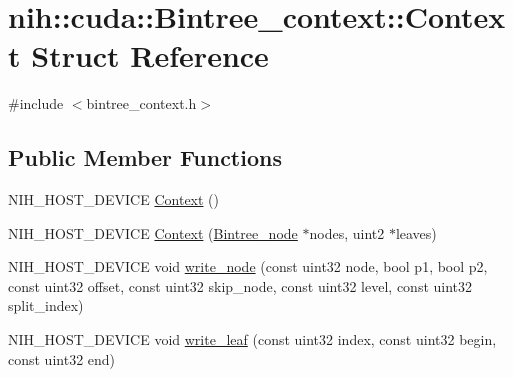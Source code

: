 \hypertarget{structnih_1_1cuda_1_1_bintree__context_1_1_context}{
\section{nih\-:\-:cuda\-:\-:\-Bintree\-\_\-context\-:\-:\-Context \-Struct \-Reference}
\label{structnih_1_1cuda_1_1_bintree__context_1_1_context}
}


{\ttfamily \#include $<$bintree\-\_\-context.\-h$>$}

\subsection*{\-Public \-Member \-Functions}
\begin{DoxyCompactItemize}
\item 
\-N\-I\-H\-\_\-\-H\-O\-S\-T\-\_\-\-D\-E\-V\-I\-C\-E \hyperlink{structnih_1_1cuda_1_1_bintree__context_1_1_context_a38ac72182031ce53aebdd6448969f667}{\-Context} ()
\item 
\-N\-I\-H\-\_\-\-H\-O\-S\-T\-\_\-\-D\-E\-V\-I\-C\-E \hyperlink{structnih_1_1cuda_1_1_bintree__context_1_1_context_a5abd5cad3dee1ff0c9baa4b3f4226d89}{\-Context} (\hyperlink{structnih_1_1_bintree__node}{\-Bintree\-\_\-node} $\ast$nodes, uint2 $\ast$leaves)
\item 
\-N\-I\-H\-\_\-\-H\-O\-S\-T\-\_\-\-D\-E\-V\-I\-C\-E void \hyperlink{structnih_1_1cuda_1_1_bintree__context_1_1_context_a75f32bc89fb6e48468fdc4f203fd5993}{write\-\_\-node} (const uint32 node, bool p1, bool p2, const uint32 offset, const uint32 skip\-\_\-node, const uint32 level, const uint32 split\-\_\-index)
\item 
\-N\-I\-H\-\_\-\-H\-O\-S\-T\-\_\-\-D\-E\-V\-I\-C\-E void \hyperlink{structnih_1_1cuda_1_1_bintree__context_1_1_context_aa262fa95c49e0375e580f2344ce3bc83}{write\-\_\-leaf} (const uint32 index, const uint32 begin, const uint32 end)
\end{DoxyCompactItemize}
